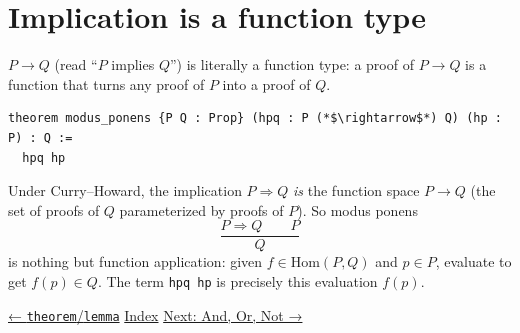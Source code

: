 \section{Implication is a function type}\label{sec:03-propositions-and-proofs:04-implication:1}

\(P \to Q\) (read ``\(P\) implies \(Q\)'') is literally a function type: a proof of \(P \to Q\) is a function that turns any proof of \(P\) into a proof of \(Q\).

\begin{lstlisting}
theorem modus_ponens {P Q : Prop} (hpq : P (*$\rightarrow$*) Q) (hp : P) : Q :=
  hpq hp
\end{lstlisting}

\begin{mathreading}

Under Curry--Howard, the implication \(P \Rightarrow
Q\) \emph{is} the function space \(P \to Q\) (the set of proofs of \(Q\) parameterized by proofs of \(P\)). So modus ponens \[
\frac{P \Rightarrow Q \qquad P}{Q}
\] is nothing but function application: given \(f \in \mathrm{Hom}(P, Q)\) and \(p \in P\), evaluate to get \(f(p) \in Q\). The term \texttt{hpq hp} is precisely this evaluation \(f(p)\).

\end{mathreading}

\hyperref[sec:03-propositions-and-proofs:03-theorem-lemma:1]{← \texttt{theorem}/\texttt{lemma}} \textbar{} \hyperref[sec:03-propositions-and-proofs:00-index:1]{Index} \textbar{} \hyperref[sec:03-propositions-and-proofs:05-and-or-not:1]{Next: And, Or, Not →}
